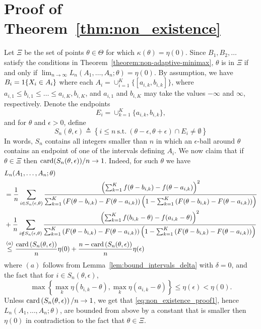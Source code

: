 
\section{Proof of Theorem~\ref{thm:non_existence}}
\label{proof:thm:non_existence}

Let $\Xi$ be the set of points $\theta \in \Theta$ for which $\kappa(\theta)
= \eta(0)$.
%
Since $B_1,B_2,\ldots$ satisfy the conditions in
Theorem~\ref{theorem:non-adaptive-minimax}, $\theta$ is in $\Xi$ if and only
if $\lim_{n\to \infty} L_n(A_1,\ldots,A_n;\theta) = \eta(0)$.  By
assumption, we have $B_i = 1\!\left\{X_i \in A_i\right\}$ where each $A_i =
\cup_{i=1}^K \{[a_{i,k},b_{i,k}]\}$, where $a_{i,1} \leq b_{i,1} \leq \ldots
\leq a_{i,K}, b_{i,K}$, and $a_{i,1}$ and $b_{i,K}$ may take the values
$-\infty$ and $\infty$, respectively. Denote the endpoints
\begin{equation*}
  E_i = \cup_{k=1}^{K}\{a_{i,k},b_{i,k}\},
\end{equation*}
and for $\theta$ and $\epsilon>0$, define
\begin{equation*}
  S_n(\theta, \epsilon) \triangleq \left\{ i\leq n ~ \mbox{s.t.}~
  (\theta-\epsilon,\theta+\epsilon) \cap E_i \neq \emptyset \right\}
\end{equation*}
In words, $S_n$ contains all integers smaller than $n$ in which an
$\epsilon$-ball around $\theta$ contains an endpoint of one of the intervals
defining $A_i$.
%
We now claim that 
if $\theta \in \Xi$ then $\mathrm{card}(S_n(\theta, \epsilon))/n \to 1$. Indeed, for such $\theta$ we have
\begin{align}
& L_n(A_1,\ldots,A_n; \theta) \nonumber \\
& = \frac{1}{n} \sum_{i \in S_n(\epsilon,\theta)}  
\frac{ \left(\sum_{k=1}^{K}  f(\theta - b_{i,k})- f(\theta - a_{i,k}) \right)^2}{ \sum_{k=1}^{K} \left( F(\theta - b_{i,k})- F(\theta - a_{i,k}) \right) \left(1-\sum_{k=1}^{K} \left( F(\theta - b_{i,k})- F(\theta - a_{i,k}) \right)\right)} \nonumber \\
& 
+ \frac{1}{n}\sum_{i \notin S_n(\epsilon,\theta) } \frac{ \left(\sum_{k=1}^{K}  f(b_{i,k}-\theta) - f(a_{i,k}-\theta) \right)^2} { \sum_{k=1}^{K} \left( F(\theta - b_{i,k})- F(\theta - a_{i,k}) \right) \left(1-\sum_{k=1}^{K} \left( F(\theta - b_{i,k})- F(\theta - a_{i,k}) \right)\right)} \nonumber \\
& \overset{(a)}{\leq}
\frac{\mathrm{card}\left(S_n(\theta,\epsilon)\right)}{n} \eta(0) + \frac{n-\mathrm{card}\left(S_n(\theta,\epsilon) \right) }{n} \eta(\epsilon) 
 \label{eq:non_existence_proof1}
\end{align}
where $(a)$ follows from Lemma~\ref{lem:bound_intervals_delta} with $\delta =0$, and the fact that for $i \in S_n(\theta, \epsilon)$, 
\begin{equation*}
\max\left\{ \max_k \eta(b_{i,k}-\theta) , \max_k \eta(a_{i,k}-\theta)  \right\} \leq \eta(\epsilon) < \eta(0). 
\end{equation*}
Unless  $\mathrm{card} \left(S_n(\theta, \epsilon) \right)/n \to 1$, we get that \eqref{eq:non_existence_proof1}, hence $L_n(A_1,\ldots,A_n ; \theta)$, are bounded from above by a constant that is smaller then $\eta(0)$ in contradiction to the fact that $\theta \in \Xi$.

